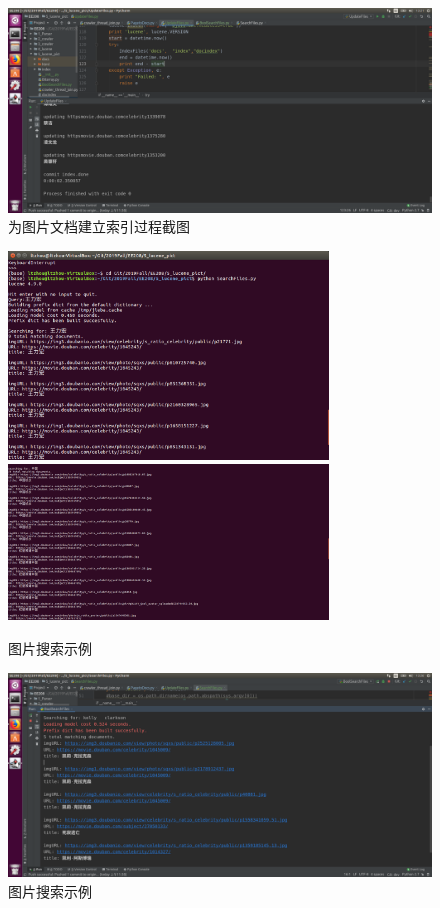 \documentclass{article}
\begin{document}
\begin{figure}[htbp]
\centering
\includegraphics[width=14.5cm]{img/indexing.png}
\caption{为图片文档建立索引过程截图}
\label{fig:indexpict}
\end{figure}

\begin{figure}[htbp]
\centering
\includegraphics[width=8.5cm]{img/search.png}
\includegraphics[width=8.5cm]{img/search2.png}
\caption{图片搜索示例}
\label{fig:search1pict}
\end{figure}

\begin{figure}[htbp]
\centering
\includegraphics[width=14.5cm]{img/search3.png}
\caption{图片搜索示例}
\label{fig:search2pict}
\end{figure}
\end{document}
